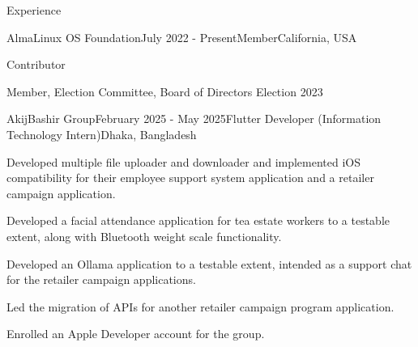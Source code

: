 \documentclass[
	a4paper,
	12pt,
]{resume}
\begin{document}
\begin{rSection}{Experience}

	\begin{rSubsection}{AlmaLinux OS Foundation}{July 2022 - Present}{Member}{California, USA}
		\item Contributor
		\item Member, Election Committee, Board of Directors Election 2023
	\end{rSubsection}

	\begin{rSubsection}{AkijBashir Group}{February 2025 - May 2025}{Flutter Developer (Information Technology Intern)}{Dhaka, Bangladesh}
		\item Developed multiple file uploader and downloader and implemented iOS compatibility for their employee support system application and a retailer campaign application.
		\item Developed a facial attendance application for tea estate workers to a testable extent, along with Bluetooth weight scale functionality.
		\item Developed an Ollama application to a testable extent, intended as a support chat for the retailer campaign applications.
		\item Led the migration of APIs for another retailer campaign program application.
		\item Enrolled an Apple Developer account for the group.
	\end{rSubsection}

\end{rSection}
\end{document}
